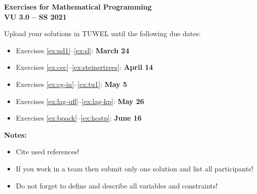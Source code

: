 \documentclass[a4paper,10pt]{article}
\begin{document}
\lstset{
    frame       = single,
    numbers     = left,
    showspaces  = false,
    showstringspaces    = false,
    captionpos  = t,
    caption     = \lstname
}
\begin{center}
  {\large \bf Exercises for Mathematical Programming \\
    VU 3.0 -- SS 2021}
\end{center}

\hrulefill\medskip

Upload your solutions in TUWEL until the following due dates:
\begin{itemize}
 \item Exercises \ref{ex:nd1}--\ref{ex:sl}: \textbf{March 24}
 \item Exercises \ref{ex:cec}--\ref{ex:steinertrees}: \textbf{April 14}
 \item Exercises \ref{ex:cg-in}--\ref{ex:tu1}: \textbf{May 5}
 \item Exercises \ref{ex:lag-ufl}--\ref{ex:lag-kp}: \textbf{May 26}
 \item Exercises \ref{ex:bpack}--\ref{ex:hcstp}: \textbf{June 16}
\end{itemize}

\textbf{Notes:}
\begin{itemize}
 \item Cite used references!
 \item If you work in a team then submit only one solution and list all participants!
 \item Do not forget to define and describe all variables and constraints!
\end{itemize}

\hrulefill\medskip
\end{document}
